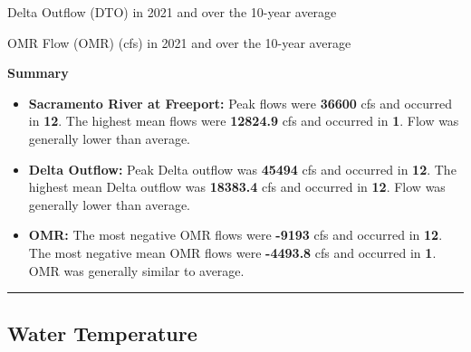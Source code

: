 \documentclass[
]{book}
\theoremstyle{definition}
\theoremstyle{definition}
\theoremstyle{definition}
\theoremstyle{definition}
\theoremstyle{remark}
\begin{document}
\label{fig:DTOflow-fig}Delta Outflow (DTO) in 2021 and over the 10-year average

\label{fig:OMRflow-fig}OMR Flow (OMR) (cfs) in 2021 and over the 10-year average

\textbf{Summary}

\begin{itemize}
\item
  \textbf{Sacramento River at Freeport:} Peak flows were \textbf{36600} cfs and occurred in \textbf{12}. The highest mean flows were \textbf{12824.9} cfs and occurred in \textbf{1}. Flow was generally lower than average.
\item
  \textbf{Delta Outflow:} Peak Delta outflow was \textbf{45494} cfs and occurred in \textbf{12}. The highest mean Delta outflow was \textbf{18383.4} cfs and occurred in \textbf{12}. Flow was generally lower than average.
\item
  \textbf{OMR:} The most negative OMR flows were \textbf{-9193} cfs and occurred in \textbf{12}. The most negative mean OMR flows were \textbf{-4493.8} cfs and occurred in \textbf{1}. OMR was generally similar to average.
\end{itemize}

\begin{center}\rule{0.5\linewidth}{0.5pt}\end{center}

\hypertarget{water-temperature-3}{%
\subsection{Water Temperature}\label{water-temperature-3}}
\end{document}
